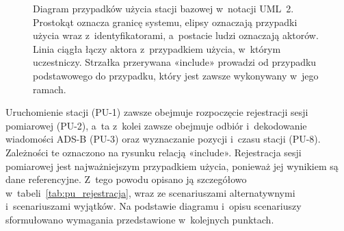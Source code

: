 \begin{figure}[!htb]
\caption{Diagram przypadków użycia stacji bazowej w~notacji UML~2. Prostokąt oznacza granicę systemu, elipsy oznaczają przypadki użycia wraz z~identyfikatorami, a~postacie ludzi oznaczają aktorów. Linia ciągła łączy aktora z~przypadkiem użycia, w~którym uczestniczy. Strzałka przerywana «include» prowadzi od przypadku podstawowego do przypadku, który jest zawsze wykonywany w~jego ramach.}
\label{rys:przypadki_uzycia}
\end{figure}

Uruchomienie stacji (PU-1) zawsze obejmuje rozpoczęcie rejestracji sesji pomiarowej (PU-2), a~ta z~kolei zawsze obejmuje odbiór i~dekodowanie wiadomości ADS-B (PU-3) oraz wyznaczanie pozycji i~czasu stacji (PU-8). Zależności te oznaczono na rysunku relacją «include». Rejestracja sesji pomiarowej jest najważniejszym przypadkiem użycia, ponieważ jej wynikiem są dane referencyjne. Z~tego powodu opisano ją szczegółowo w~tabeli~\ref{tab:pu_rejestracja}, wraz ze scenariuszami alternatywnymi i~scenariuszami wyjątków. Na podstawie diagramu i~opisu scenariuszy sformułowano wymagania przedstawione w~kolejnych punktach.

